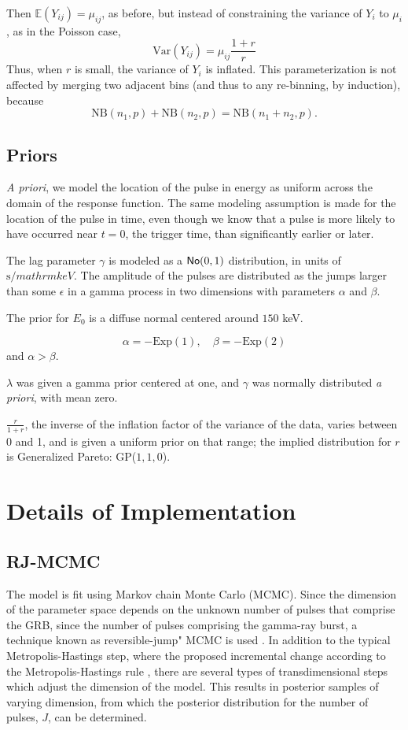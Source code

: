 \documentclass[12pt,letterpaper]{article}
\begin{document}
Then $\mathbb{E}(Y_{ij}) = \mu_{ij}$, as before, but instead of constraining the variance of $Y_i$ to $\mu_i$, as in the Poisson case, 
\[ \text{Var}(Y_{ij}) = \mu_{ij} \frac{1+r}{r} \]
Thus, when $r$ is small, the variance of $Y_i$ is inflated.  This  parameterization is not affected by merging two adjacent bins (and thus to any re-binning, by induction), because \[\text{NB}(n_1, p) + \text{NB}(n_2, p)  = \text{NB}(n_1 + n_2, p). \]   
    
    \subsection{Priors}
     \emph{A priori}, we model the location of the pulse in energy as uniform across the domain of the response function. The same modeling assumption is made for the location of the pulse in time, even though we know that a pulse is more likely to have occurred near $t = 0$, the trigger time, than significantly earlier or later. 

The lag parameter $\gamma$ is modeled as a $\mathsf{No}(0,1)$  distribution, in units of $\mathrm{s}/mathrm{keV}$.  The amplitude of the pulses are distributed as the jumps larger than some $\epsilon$ in a gamma process in two dimensions with parameters $\alpha$ and $\beta$. 

The prior for $E_0$ is a diffuse normal centered around $150$ keV. 

$$\alpha = -  \text{Exp}(1), \quad  \beta = - \text{Exp}(2)$$ and $\alpha > \beta$.

$\lambda$ was given a gamma prior centered at one, and $\gamma$ was normally distributed \emph{a priori}, with  mean zero. 

$\frac{r}{1 + r}$, the inverse of the inflation factor of the variance of the data, varies between 0 and 1, and is given a uniform prior on that range; the implied distribution for $r$ is Generalized Pareto: GP($1,1,0$).



\section{Details of Implementation}
    \subsection{RJ-MCMC}
    The model is fit using Markov chain  Monte Carlo (MCMC).  Since the dimension of the parameter space depends on the unknown number of pulses that comprise the GRB, since the number of pulses comprising the gamma-ray burst, a technique known as reversible-jump" MCMC is used \citet{Gree:1995}.  In addition to the typical Metropolis-Hastings step, where the proposed incremental change according to the Metropolis-Hastings rule \citet{Hast:1970}, there are several types of transdimensional steps which adjust the dimension of the model.   This results in posterior samples of varying dimension, from which the posterior distribution for the number of pulses, $J$, can be determined.
\end{document}
